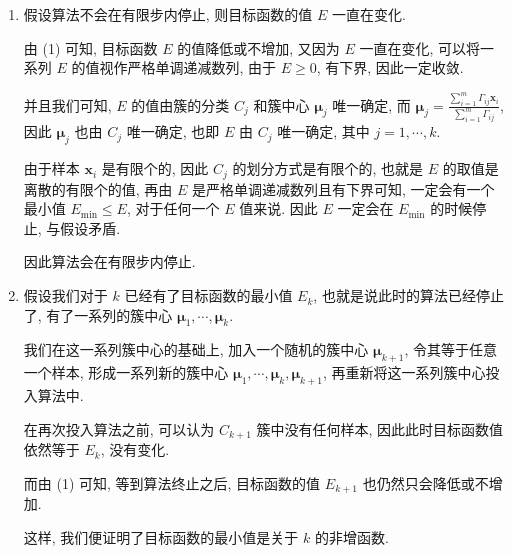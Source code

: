 \documentclass[answers]{exam}  %
\begin{document}
\begin{questions}
\begin{solution}
\begin{enumerate}
      \item

            假设算法不会在有限步内停止, 则目标函数的值 $E$ 一直在变化.

            由 (1) 可知, 目标函数 $E$ 的值降低或不增加, 又因为 $E$ 一直在变化, 可以将一系列 $E$ 的值视作严格单调递减数列, 由于 $E \ge 0$, 有下界, 因此一定收敛.

            并且我们可知, $E$ 的值由簇的分类 $C_j$ 和簇中心 $\bm{\mu}_j$ 唯一确定, 而 $\displaystyle \bm{\mu}_j = \frac{\sum_{i=1}^{m}\Gamma_{ij}\bm{x}_{i}}{\sum_{i=1}^{m}\Gamma_{ij}}$, 因此 $\bm{\mu}_j$ 也由 $C_j$ 唯一确定, 也即 $E$ 由 $C_j$ 唯一确定, 其中 $j = 1, \cdots, k$.

            由于样本 $\bm{x}_i$ 是有限个的, 因此 $C_j$ 的划分方式是有限个的, 也就是 $E$ 的取值是离散的有限个的值, 再由 $E$ 是严格单调递减数列且有下界可知, 一定会有一个最小值 $E_{\min} \le E$, 对于任何一个 $E$ 值来说. 因此 $E$ 一定会在 $E_{\min}$ 的时候停止, 与假设矛盾.

            因此算法会在有限步内停止.

      \item

            假设我们对于 $k$ 已经有了目标函数的最小值 $E_{k}$, 也就是说此时的算法已经停止了, 有了一系列的簇中心 $\bm{\mu}_1, \cdots, \bm{\mu}_k$.

            我们在这一系列簇中心的基础上, 加入一个随机的簇中心 $\bm{\mu}_{k+1}$, 令其等于任意一个样本, 形成一系列新的簇中心 $\bm{\mu}_1, \cdots, \bm{\mu}_k, \bm{\mu}_{k+1}$, 再重新将这一系列簇中心投入算法中.

            在再次投入算法之前, 可以认为 $C_{k+1}$ 簇中没有任何样本, 因此此时目标函数值依然等于 $E_{k}$, 没有变化.

            而由 (1) 可知, 等到算法终止之后, 目标函数的值 $E_{k+1}$ 也仍然只会降低或不增加.

            这样, 我们便证明了目标函数的最小值是关于 $k$ 的非增函数.
    \end{enumerate}
  \end{solution}

\end{questions}
\end{document}

